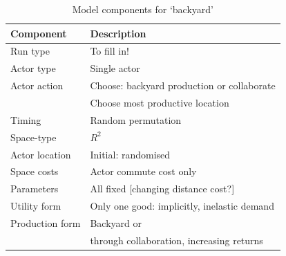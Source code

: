 \renewcommand{\arraystretch}{1.2}
\begin{table}[!hbt]
\begin{center}

\begin{tabular}{|l|l|}
\hline 
\textbf{Component} & \textbf{Description}\\
\hline
Run type & To fill in!\\
\hline
Actor type & Single actor\\
\hline
Actor action & Choose: backyard production or collaborate\\
& Choose most productive location\\ 
\hline
Timing &
Random permutation\\
\hline
Space-type &
$R^2$\\
\hline
Actor location & Initial: randomised\\
\hline
Space costs & Actor commute cost only\\
\hline
Parameters & All fixed [changing distance cost?]\\
\hline
Utility form & Only one good: implicitly, inelastic demand\\
\hline
Production form & Backyard or\\
& through collaboration, increasing returns\\
\hline

\end{tabular}

\caption{Model components for `backyard' \label{tab:firmsBackyard}}
\end{center}
\end{table}